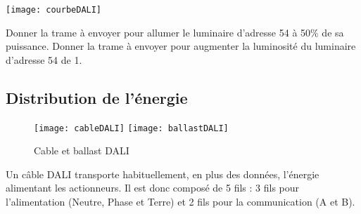 	 \begin{center}
		\texttt{[image: courbeDALI]}
	\end{center}

	\begin{UPSTIactivite}
		\UPSTIquestion Donner la trame à envoyer pour allumer le luminaire d'adresse 54 à 50\% de sa puissance.
		\vspace{1cm}
		\UPSTIquestion Donner la trame à envoyer pour augmenter la luminosité du luminaire d'adresse 54 de 1.  
		\vspace{1cm}
	\end{UPSTIactivite}

	\subsection{Distribution de l'énergie}
	\begin{figure}[h!]
		\texttt{[image: cableDALI]}
		\hfill
		\texttt{[image: ballastDALI]}
		\caption{Cable et ballast DALI}
	\end{figure}

	Un câble DALI transporte habituellement, en plus des données, l'énergie alimentant les actionneurs. Il est donc composé de 5 fils : 3 fils pour l'alimentation (Neutre, Phase et Terre) et 2 fils pour la communication (A et B).\\

	\begin{UPSTIactivite}
		\UPSTIeleveOnly{\vspace{8cm}}
	\end{UPSTIactivite}





